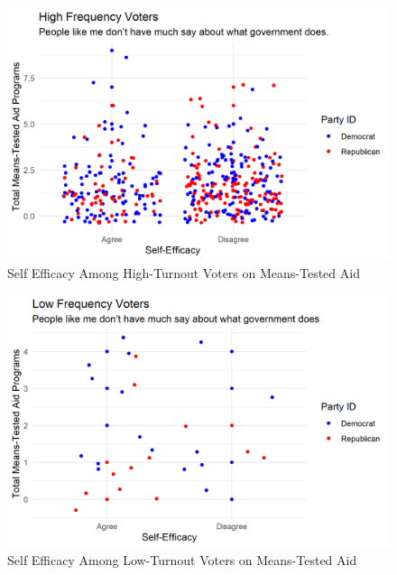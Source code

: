 \documentclass[12pt]{paper}
\begin{document}
\begin{figure}[H]
	\includegraphics[scale=0.7]{Figs/scatter_means_efficacy_high.png} \centering
	\caption{Self Efficacy Among High-Turnout Voters on Means-Tested Aid}
	\label{}
\end{figure}


\begin{figure}[H]
	\includegraphics[scale=0.7]{Figs/scatter_means_efficacy_low.png} \centering
	\caption{Self Efficacy Among Low-Turnout Voters on Means-Tested Aid}
	\label{}
\end{figure}
\end{document}
